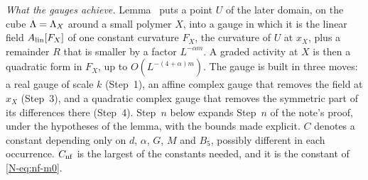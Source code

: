 \begin{detail}\label{xb:d-nf}
\emph{What the gauges achieve.} Lemma~ puts a point $U$ of the later domain, on the cube $\Lambda=\Lambda_X$ around a small polymer $X$, into a gauge in which it is the linear field $A_{\rm lin}[F_X]$ of one constant curvature $F_X$, the curvature of $U$ at $x_X$, plus a remainder $R$ that is smaller by a factor $L^{-\alpha m}$. A graded activity at $X$ is then a quadratic form in $F_X$, up to $O(L^{-(4+\alpha)m})$. The gauge is built in three moves: a real gauge of scale $k$ (Step~1), an affine complex gauge that removes the field at $x_X$ (Step~3), and a quadratic complex gauge that removes the symmetric part of its differences there (Step~4). Step~$n$ below expands Step~$n$ of the note's proof, under the hypotheses of the lemma, with the bounds made explicit. $C$ denotes a constant depending only on $d$, $\alpha$, $G$, $M$ and $B_5$, possibly different in each occurrence. $C_{\rm nf}$ is the largest of the constants needed, and it is the constant of \eqref{N-eq:nf-m0}.
\end{detail}

